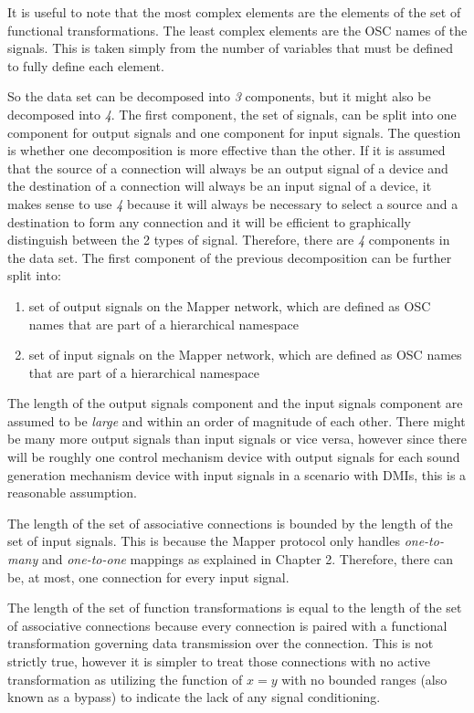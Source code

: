 It is useful to note that the most complex elements are the elements of the set of functional transformations. The least complex elements are the OSC names of the signals. This is taken simply from the number of variables that must be defined to fully define each element.

So the data set can be decomposed into \emph{3} components, but it might also be decomposed into \emph{4}. The first component, the set of signals, can be split into one component for output signals and one component for input signals. The question is whether one decomposition is more effective than the other. If it is assumed that the source of a connection will always be an output signal of a device and the destination of a connection will always be an input signal of a device, it makes sense to use \emph{4} because it will always be necessary to select a source and a destination to form any connection and it will be efficient to graphically distinguish between the 2 types of signal. Therefore, there are \emph{4} components in the data set. The first component of the previous decomposition can be further split into:

\begin{enumerate}
\item set of output signals on the Mapper network, which are defined as OSC names that are part of a hierarchical namespace
\item set of input signals on the Mapper network, which are defined as OSC names that are part of a hierarchical namespace
\end{enumerate}

The length of the output signals component and the input signals component are assumed to be \emph{large} and within an order of magnitude of each other. There might be many more output signals than input signals or vice versa, however since there will be roughly one control mechanism device with output signals for each sound generation mechanism device with input signals in a scenario with DMIs, this is a reasonable assumption.

The length of the set of associative connections is bounded by the length of the set of input signals. This is because the Mapper protocol only handles \emph{one-to-many} and \emph{one-to-one} mappings as explained in Chapter 2. Therefore, there can be, at most, one connection for every input signal.

The length of the set of function transformations is equal to the length of the set of associative connections because every connection is paired with a functional transformation governing data transmission over the connection. This is not strictly true, however it is simpler to treat those connections with no active transformation as utilizing the function of \begin{math}x = y\end{math} with no bounded ranges (also known as a bypass) to indicate the lack of any signal conditioning.  

